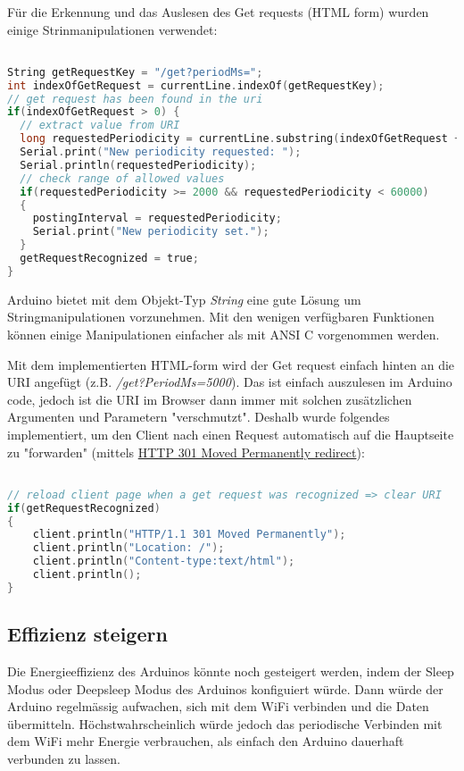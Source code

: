 \documentclass{article}
\begin{document}
Für die Erkennung und das Auslesen des Get requests (HTML form) wurden einige Strinmanipulationen verwendet:
\begin{lstlisting}[frame=single, language=C, breaklines=true]  % Start your code-block

String getRequestKey = "/get?periodMs=";
int indexOfGetRequest = currentLine.indexOf(getRequestKey);
// get request has been found in the uri
if(indexOfGetRequest > 0) {   
  // extract value from URI
  long requestedPeriodicity = currentLine.substring(indexOfGetRequest + getRequestKey.length()).toInt();  
  Serial.print("New periodicity requested: ");
  Serial.println(requestedPeriodicity);
  // check range of allowed values
  if(requestedPeriodicity >= 2000 && requestedPeriodicity < 60000)  
  {
    postingInterval = requestedPeriodicity;
    Serial.print("New periodicity set.");
  }
  getRequestRecognized = true;
}

\end{lstlisting}
Arduino bietet mit dem Objekt-Typ \textit{String} eine gute Lösung um Stringmanipulationen vorzunehmen. Mit den wenigen verfügbaren Funktionen können einige Manipulationen einfacher als mit ANSI C vorgenommen werden.

Mit dem implementierten HTML-form wird der Get request einfach hinten an die URI angefügt (z.B. \textit{/get?PeriodMs=5000}). Das ist einfach auszulesen im Arduino code, jedoch ist die URI im Browser dann immer mit solchen zusätzlichen Argumenten und Parametern "verschmutzt". Deshalb wurde folgendes implementiert, um den Client nach einen Request automatisch auf die Hauptseite zu "forwarden" (mittels \href{https://en.wikipedia.org/wiki/URL_redirection}{HTTP 301 Moved Permanently redirect}):
\begin{lstlisting}[frame=single, language=C, breaklines=true]  % Start your code-block

// reload client page when a get request was recognized => clear URI
if(getRequestRecognized)
{
    client.println("HTTP/1.1 301 Moved Permanently");
    client.println("Location: /");
    client.println("Content-type:text/html");
    client.println();
}

\end{lstlisting}



\subsection{Effizienz steigern}

Die Energieeffizienz des Arduinos könnte noch gesteigert werden, indem der Sleep Modus oder Deepsleep Modus des Arduinos konfiguiert würde. Dann würde der Arduino regelmässig aufwachen, sich mit dem WiFi verbinden und die Daten übermitteln.
Höchstwahrscheinlich würde jedoch das periodische Verbinden mit dem WiFi mehr Energie verbrauchen, als einfach den Arduino dauerhaft verbunden zu lassen.
\end{document}
